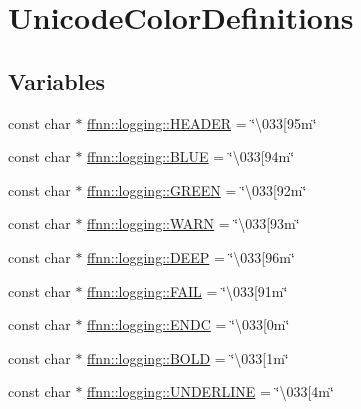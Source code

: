 \hypertarget{group___unicode_color_definitions}{\section{Unicode\-Color\-Definitions}
\label{group___unicode_color_definitions}
}
\subsection*{Variables}
\begin{DoxyCompactItemize}
\item 
const char $\ast$ \hyperlink{group___unicode_color_definitions_ga65590452b7707feb609f43a9ca306d42}{ffnn\-::logging\-::\-H\-E\-A\-D\-E\-R} = \char`\"{}\textbackslash{}033\mbox{[}95m\char`\"{}
\item 
const char $\ast$ \hyperlink{group___unicode_color_definitions_ga3e2c8118c023bd9d8bb394366f943cc5}{ffnn\-::logging\-::\-B\-L\-U\-E} = \char`\"{}\textbackslash{}033\mbox{[}94m\char`\"{}
\item 
const char $\ast$ \hyperlink{group___unicode_color_definitions_ga00119b4fa7f1c1e88aec7e09e2215298}{ffnn\-::logging\-::\-G\-R\-E\-E\-N} = \char`\"{}\textbackslash{}033\mbox{[}92m\char`\"{}
\item 
const char $\ast$ \hyperlink{group___unicode_color_definitions_gafc935a693ebe97569c82dd2415bb7373}{ffnn\-::logging\-::\-W\-A\-R\-N} = \char`\"{}\textbackslash{}033\mbox{[}93m\char`\"{}
\item 
const char $\ast$ \hyperlink{group___unicode_color_definitions_gaf7e0109fd04ef8852f6e1fa5c96057e1}{ffnn\-::logging\-::\-D\-E\-E\-P} = \char`\"{}\textbackslash{}033\mbox{[}96m\char`\"{}
\item 
const char $\ast$ \hyperlink{group___unicode_color_definitions_ga2047db0e31e0a45c7c213845567afc06}{ffnn\-::logging\-::\-F\-A\-I\-L} = \char`\"{}\textbackslash{}033\mbox{[}91m\char`\"{}
\item 
const char $\ast$ \hyperlink{group___unicode_color_definitions_gab21e47dcbc216f8fc7de88bd217f9f0a}{ffnn\-::logging\-::\-E\-N\-D\-C} = \char`\"{}\textbackslash{}033\mbox{[}0m\char`\"{}
\item 
const char $\ast$ \hyperlink{group___unicode_color_definitions_ga32fca3fc24af93ce9c4ca33b4a6a3dde}{ffnn\-::logging\-::\-B\-O\-L\-D} = \char`\"{}\textbackslash{}033\mbox{[}1m\char`\"{}
\item 
const char $\ast$ \hyperlink{group___unicode_color_definitions_gab2b4d719c3fe8672abf96e00a37c799c}{ffnn\-::logging\-::\-U\-N\-D\-E\-R\-L\-I\-N\-E} = \char`\"{}\textbackslash{}033\mbox{[}4m\char`\"{}
\end{DoxyCompactItemize}


